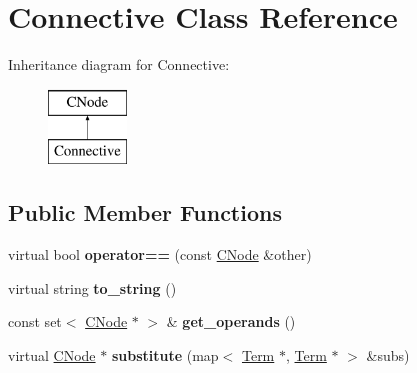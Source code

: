 \hypertarget{classConnective}{\section{\-Connective \-Class \-Reference}
\label{classConnective}
}
\-Inheritance diagram for \-Connective\-:\begin{figure}[H]
\begin{center}
\leavevmode
\includegraphics[height=2.000000cm]{classConnective}
\end{center}
\end{figure}
\subsection*{\-Public \-Member \-Functions}
\begin{DoxyCompactItemize}
\item 
\hypertarget{classConnective_a5fb6d4411e14493a4d8de27cc45bf616}{virtual bool {\bfseries operator==} (const \hyperlink{classCNode}{\-C\-Node} \&other)}\label{classConnective_a5fb6d4411e14493a4d8de27cc45bf616}

\item 
\hypertarget{classConnective_af8b03837853b2822a19cb9e500f3348b}{virtual string {\bfseries to\-\_\-string} ()}\label{classConnective_af8b03837853b2822a19cb9e500f3348b}

\item 
\hypertarget{classConnective_a735578c9ea3e025b1b11731e2adfc130}{const set$<$ \hyperlink{classCNode}{\-C\-Node} $\ast$ $>$ \& {\bfseries get\-\_\-operands} ()}\label{classConnective_a735578c9ea3e025b1b11731e2adfc130}

\item 
\hypertarget{classConnective_a0abec80116d43a285485d1a7e641766f}{virtual \hyperlink{classCNode}{\-C\-Node} $\ast$ {\bfseries substitute} (map$<$ \hyperlink{classTerm}{\-Term} $\ast$, \hyperlink{classTerm}{\-Term} $\ast$ $>$ \&subs)}\label{classConnective_a0abec80116d43a285485d1a7e641766f}

\end{DoxyCompactItemize}
